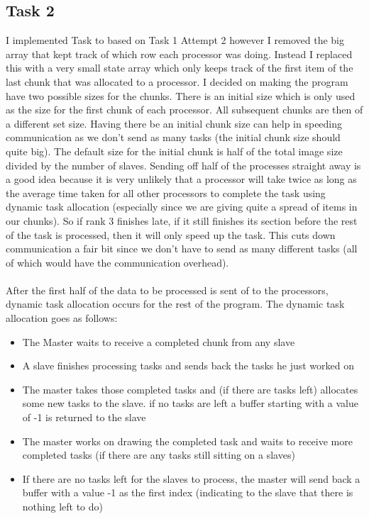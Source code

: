 \documentclass{article}
\begin{document}
    \subsection{Task 2}
        I implemented Task to based on Task 1 Attempt 2 however I removed the big array that kept track of which row each processor was doing. Instead I replaced this with a 
        very small state array which only keeps track of the first item of the last chunk that was allocated to a processor. I decided on making the program have two possible
        sizes for the chunks. There is an initial size which is only used as the size for the first chunk of each processor. All subsequent chunks are then of a different set size. 
        Having there be an initial chunk size can help in speeding communication as we don't send as many tasks (the initial chunk size should quite big). The default size for the initial
        chunk is half of the total image size divided by the number of slaves.
        Sending off half of the processes straight away is a good idea because it is very unlikely that a processor will take twice as long as the average time taken for all other processors to complete the task using dynamic task allocation 
        (especially since we are giving quite a spread of items in our chunks). So if rank 3 finishes late, if it still finishes its section before the rest of the task is processed, then
        it will only speed up the task. This cuts down communication a fair bit since we don't have to send as many different tasks (all of which would have the communication overhead).
        \\
        \\
        After the first half of the data to be processed is sent of to the processors, dynamic task allocation occurs for the rest of the program. The dynamic task allocation goes as follows:
        
        \renewcommand{\labelitemi}{$\textendash$}
        \begin{itemize}
            \item The Master waits to receive a completed chunk from any slave
            \item A slave finishes processing tasks and sends back the tasks he just worked on
            \item The master takes those completed tasks and (if there are tasks left) allocates some new tasks to the slave. if no tasks are left a buffer starting with a value of -1 is returned to the slave
            \item The master works on drawing the completed task and waits to receive more completed tasks (if there are any tasks still sitting on a slaves)

            \item If there are no tasks left for the slaves to process, the master will send back a buffer with a value -1 as the first index (indicating to the slave that there is nothing left to do)
        \end{itemize}
\end{document}
